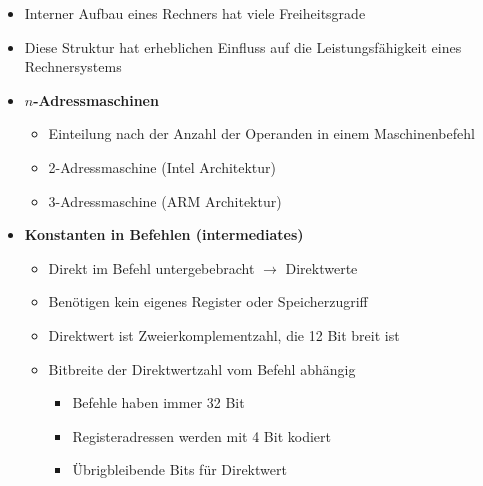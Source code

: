 \begin{itemize}
\begin{itemize}
\begin{itemize}
                    \end{itemize}
            \end{itemize}
        \item Interner Aufbau eines Rechners hat viele Freiheitsgrade
        \item Diese Struktur hat erheblichen Einfluss auf die Leistungsfähigkeit eines Rechnersystems 
        \item \textbf{$n$-Adressmaschinen}
            \begin{itemize}
                \item Einteilung nach der Anzahl der Operanden in einem Maschinenbefehl 
                \item 2-Adressmaschine (Intel Architektur)
                \item 3-Adressmaschine (ARM Architektur)
            \end{itemize}
        \item \textbf{Konstanten in Befehlen (intermediates)}
            \begin{itemize}
                \item Direkt im Befehl untergebebracht $\rightarrow$ Direktwerte
                \item Benötigen kein eigenes Register oder Speicherzugriff
                \item Direktwert ist Zweierkomplementzahl, die 12 Bit breit ist 
                \item Bitbreite der Direktwertzahl vom Befehl abhängig
                    \begin{itemize}
                        \item Befehle haben immer 32 Bit
                        \item Registeradressen werden mit 4 Bit kodiert
                        \item Übrigbleibende Bits für Direktwert
                    \end{itemize}
            \end{itemize}
    \end{itemize}

